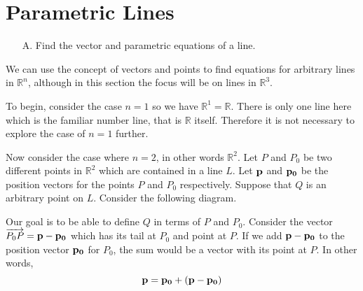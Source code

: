 \section{Parametric Lines}

\begin{outcome}

\begin{enumerate}

\item[A.] Find the vector and parametric equations of a line.

\end{enumerate}
\end{outcome}

We can use the concept of vectors and points to find equations for arbitrary lines in $\mathbb{R}^n$, although in this section the focus will be on lines in $\mathbb{R}^3$. 

To begin, consider the case $n=1$ so we have $\mathbb{R}^{1}=\mathbb{R}$. There is only one line here which is the familiar number line, that is $\mathbb{R}$ itself. Therefore it is not necessary to explore the case of $n=1$ further. 

Now consider the case where $n=2$, in other words $\mathbb{R}^2$.  Let $P $ and $P_0$ be
two different points in $\mathbb{R}^{2}$ which are contained in a line
$L$. Let ${\bf p}$ and ${\bf p_0}$ be the position vectors for the points $P$ and $P_0$
respectively. Suppose that $Q$ is an arbitrary point on $L$. Consider the following
diagram.

\begin{center}
\end{center}

Our goal is to be able to define $Q$ in terms of $P$  and $P_0$. Consider the vector $\overrightarrow{P_0P} = {\bf p} - {\bf p_0}$ which
has its tail at $P_0$ and point at $P$. If we add ${\bf p} - {\bf p_0}$ to the position vector ${\bf p_0}$ for $P_0$,  
the sum would be a vector with its point at $P$. 
In other words,
\begin{equation*}
{\bf p} = {\bf p_0} + ({\bf p} - {\bf p_0})
\end{equation*}

